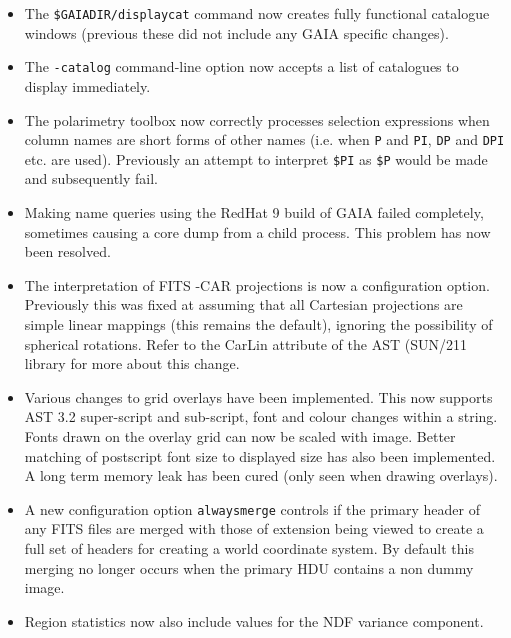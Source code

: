 \documentclass[twoside,11pt]{article}
\newcommand{\xref}[3]{#1}
\renewcommand{\_}{\texttt{\symbol{95}}}
\newcommand{\mytt}[1]{{\texttt{#1}}}
\begin{document}
\begin{itemize}
     \item The \mytt{\$GAIA\_DIR/displaycat} command now creates fully
       functional
       catalogue windows (previous these did not include any GAIA specific
       changes).

     \item The \mytt{-catalog} command-line option now accepts a list of
       catalogues to
       display immediately.

     \item The polarimetry toolbox now correctly processes selection expressions
       when column names are short forms of other names (i.e. when \mytt{P}
       and \mytt{PI},
       \mytt{DP} and \mytt{DPI} etc. are used). Previously an attempt to
       interpret \mytt{\$PI} as
        \mytt{\$P} would be made and subsequently fail.

     \item Making name queries using the RedHat 9 build of GAIA failed
       completely, sometimes causing a core dump from a child process.
       This problem has now been resolved.

     \item The interpretation of FITS -CAR projections is now a configuration
       option. Previously this was fixed at assuming that all Cartesian
       projections are simple linear mappings (this remains the default),
       ignoring the possibility of spherical rotations. Refer to the CarLin
       attribute of the AST (\xref{SUN/211}{sun211}) library for more about
       this change.

     \item Various changes to grid overlays have been implemented.
       This now supports AST 3.2 super-script and sub-script, font and colour
       changes within a string. Fonts drawn on the overlay grid can now be
       scaled with image. Better matching of postscript font size to displayed
       size has also been implemented. A long term memory leak has been cured
       (only seen when drawing overlays).

     \item A new configuration option \mytt{always\_merge} controls if the
       primary header
       of any FITS files are merged with those of extension being viewed to
       create a full set of headers for creating a world coordinate system. By
       default this merging no longer occurs when the primary HDU contains a
       non dummy image.

     \item Region statistics now also include values for the NDF variance
       component.

\end{itemize}
\end{document}
